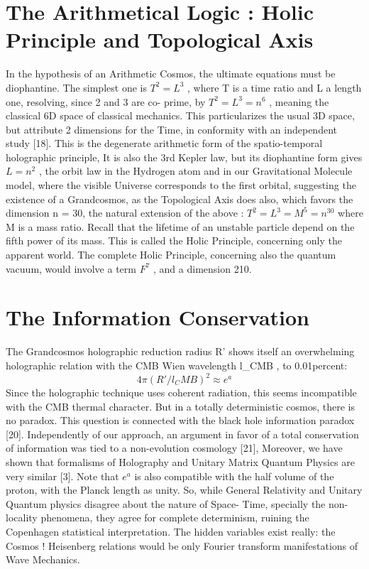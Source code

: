\section {The Arithmetical Logic : Holic Principle and Topological Axis}

In the hypothesis of an Arithmetic Cosmos, the ultimate equations must be diophantine. The
simplest one is $T^2 = L^3$ , where T is a time ratio and L a length one, resolving, since 2 and 3 are co-
prime, by $T^2 = L^3 = n^6$ , meaning the classical 6D space of classical mechanics. This particularizes
the usual 3D space, but attribute 2 dimensions for the Time, in conformity with an independent
study [18].
This is the degenerate arithmetic form of the spatio-temporal holographic principle, It is also the
3rd Kepler law, but its diophantine form gives $L = n^2$ , the orbit law in the Hydrogen atom and in our
Gravitational Molecule model, where the visible Universe corresponds to the first orbital,
suggesting the existence of a Grandcosmos, as the Topological Axis does also, which favors the
dimension n = 30, the natural extension of the above :
$T^2 = L^3 = M^5 = n^30$ where M is a mass ratio. Recall that the lifetime of an unstable particle depend on the fifth power of its mass. This is called the Holic Principle, concerning only the apparent world. The complete Holic
Principle, concerning also the quantum vacuum, would involve a term $F^7$ , and a dimension 210.

\section {The Information Conservation}

The Grandcosmos holographic reduction radius R' shows itself an overwhelming holographic
relation with the CMB Wien wavelength l_CMB , to 0.01{percent}:
$$4\pi(R'/l_CMB )^2 ≈ e^a$$
Since the holographic technique uses coherent radiation, this seems incompatible with the CMB
thermal character. But in a totally deterministic cosmos, there is no paradox. This question is
connected with the black hole information paradox [20]. Independently of our approach, an
argument in favor of a total conservation of information was tied to a non-evolution cosmology
[21], Moreover, we have shown that formalisms of Holography and Unitary Matrix Quantum
Physics are very similar [3]. Note that $e^a$ is also compatible with the half volume of the proton, with
the Planck length as unity.
So, while General Relativity and Unitary Quantum physics disagree about the nature of Space-
Time, specially the non-locality phenomena, they agree for complete determinism, ruining the
Copenhagen statistical interpretation. The hidden variables exist really: the Cosmos ! Heisenberg
relations would be only Fourier transform manifestations of Wave Mechanics.

